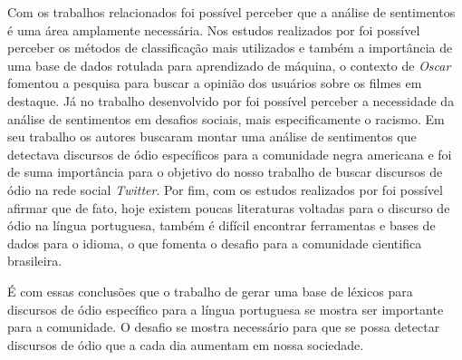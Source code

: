 Com os trabalhos relacionados foi possível perceber que a análise de sentimentos é uma área amplamente necessária. Nos estudos realizados por  foi possível perceber os métodos de classificação mais utilizados e também a importância de uma base de dados rotulada para aprendizado de máquina, o contexto de \textit{Oscar} fomentou a pesquisa para buscar a opinião dos usuários sobre os filmes em destaque. Já no trabalho desenvolvido por  foi possível perceber a necessidade da análise de sentimentos em desafios sociais, mais especificamente o racismo. Em seu trabalho os autores buscaram montar uma análise de sentimentos que detectava discursos de ódio específicos para a comunidade negra americana e foi de suma importância para o objetivo do nosso trabalho de buscar discursos de ódio na rede social \textit{Twitter}. Por fim, com os estudos realizados por  foi possível afirmar que de fato, hoje existem poucas literaturas voltadas para o discurso de ódio na língua portuguesa, também é difícil encontrar ferramentas e bases de dados para o idioma, o que fomenta o desafio para a comunidade cientifica brasileira.

É com essas conclusões que o trabalho de gerar uma base de léxicos para discursos de ódio específico para a língua portuguesa se mostra ser importante para a comunidade. O desafio se mostra necessário para que se possa detectar discursos de ódio que a cada dia aumentam em nossa sociedade. 
